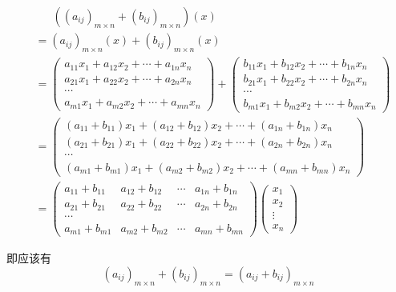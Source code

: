 \begin{align*}
    &\phantom{=\ }((a_{ij})_{m\times n} + (b_{ij})_{m\times n})(x)\\
    &= (a_{ij})_{m\times n} (x) + (b_{ij})_{m\times n} (x) \\
    &= \begin{pmatrix}
        a_{11} x_1 + a_{12} x_2 + \cdots + a_{1n} x_n \\
        a_{21} x_1 + a_{22} x_2 + \cdots + a_{2n} x_n \\
        \cdots\\
        a_{m1} x_1 + a_{m2} x_2 + \cdots + a_{mn} x_n
    \end{pmatrix} + \begin{pmatrix}
        b_{11} x_1 + b_{12} x_2 + \cdots + b_{1n} x_n \\
        b_{21} x_1 + b_{22} x_2 + \cdots + b_{2n} x_n \\
        \cdots\\
        b_{m1} x_1 + b_{m2} x_2 + \cdots + b_{mn} x_n
    \end{pmatrix} \\
    &= \begin{pmatrix}
        (a_{11} + b_{11}) x_1 + (a_{12} + b_{12}) x_2 + \cdots + (a_{1n} + b_{1n}) x_n \\
        (a_{21} + b_{21}) x_1 + (a_{22} + b_{22}) x_2 + \cdots + (a_{2n} + b_{2n}) x_n \\
        \cdots\\
        (a_{m1} + b_{m1}) x_1 + (a_{m2} + b_{m2}) x_2 + \cdots + (a_{mn} + b_{mn}) x_n
    \end{pmatrix} \\
    &= \begin{pmatrix}
        a_{11} + b_{11} & a_{12} + b_{12} & \cdots & a_{1n} + b_{1n} \\
        a_{21} + b_{21} & a_{22} + b_{22} & \cdots & a_{2n} + b_{2n} \\
        \cdots\\
        a_{m1} + b_{m1} & a_{m2} + b_{m2} & \cdots & a_{mn} + b_{mn}
    \end{pmatrix}
    \begin{pmatrix}
        x_1 \\ x_2 \\ \vdots \\ x_n
    \end{pmatrix}
\end{align*}

即应该有
\[
    (a_{ij})_{m\times n} + (b_{ij})_{m\times n} = (a_{ij} + b_{ij})_{m\times n}
\]

